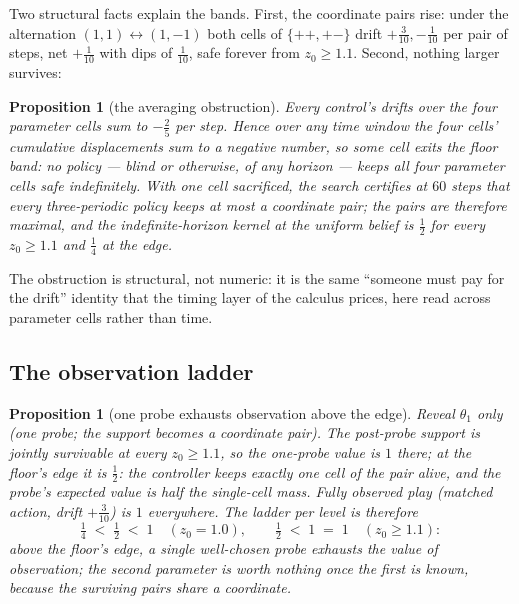 \documentclass[10pt,twocolumn]{article}
\theoremstyle{plain}
\newtheorem{proposition}[theorem]{Proposition}
\theoremstyle{definition}
\theoremstyle{remark}
\begin{document}
Two structural facts explain the bands. First, the coordinate pairs
rise: under the alternation \((1,1) \leftrightarrow (1,-1)\) both
cells of \(\{++, +-\}\) drift \(+\tfrac3{10}, -\tfrac1{10}\) per pair
of steps, net \(+\tfrac1{10}\) with dips of \(\tfrac1{10}\), safe
forever from \(z_{0} \ge 1.1\). Second, nothing larger survives:

\begin{proposition}[the averaging obstruction]\label{prop:obstruction}
Every control's drifts over the four parameter cells sum to
\(-\tfrac25\) per step. Hence over any time window the four cells'
cumulative displacements sum to a negative number, so some cell exits
the floor band: no policy --- blind or otherwise, of any horizon ---
keeps all four parameter cells safe indefinitely. With one cell
sacrificed, the search certifies at \(60\) steps that every
three-periodic policy keeps at most a coordinate pair; the pairs are
therefore maximal, and the indefinite-horizon kernel at the uniform
belief is \(\tfrac12\) for every \(z_{0} \ge 1.1\) and \(\tfrac14\) at
the edge.
\end{proposition}

The obstruction is structural, not numeric: it is the same
``someone must pay for the drift'' identity that the timing layer of
the calculus prices, here read across parameter cells rather than
time.

\subsection{The observation ladder}\label{ladder}

\begin{proposition}[one probe exhausts observation above the edge]
\label{prop:ladder}
Reveal \(\theta_{1}\) only (one probe; the support becomes a
coordinate pair). The post-probe support is jointly survivable at
every \(z_{0} \ge 1.1\), so the one-probe value is \(1\) there; at the
floor's edge it is \(\tfrac12\): the controller keeps exactly one
cell of the pair alive, and the probe's expected value is half the
single-cell mass. Fully observed play (matched action,
drift \(+\tfrac3{10}\)) is \(1\) everywhere. The ladder per level is
therefore
\[
\tfrac14 \;<\; \tfrac12 \;<\; 1 \quad (z_{0} = 1.0), \qquad
\tfrac12 \;<\; 1 \;=\; 1 \quad (z_{0} \ge 1.1):
\]
above the floor's edge, a single well-chosen probe exhausts the value
of observation; the second parameter is worth nothing once the first
is known, because the surviving pairs share a coordinate.
\end{proposition}
\end{document}
